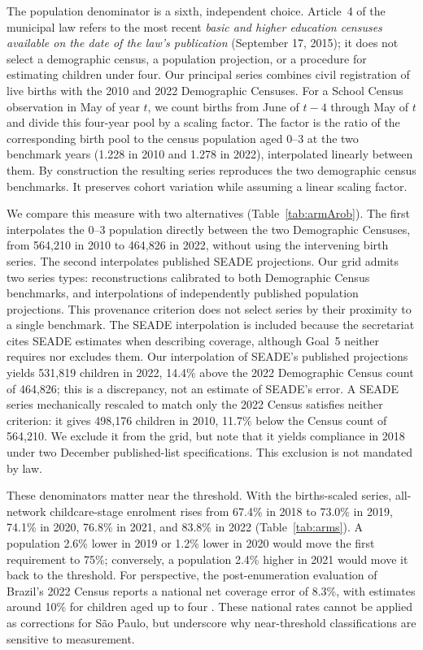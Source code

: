 The population denominator is a sixth, independent choice. Article~4 of the municipal law refers to the most recent \emph{basic and higher education censuses available on the date of the law's publication} (September 17, 2015); it does not select a demographic census, a population projection, or a procedure for estimating children under four. Our principal series combines civil registration of live births with the 2010 and 2022 Demographic Censuses. For a School Census observation in May of year $t$, we count births from June of $t-4$ through May of $t$ and divide this four-year pool by a scaling factor. The factor is the ratio of the corresponding birth pool to the census population aged 0--3 at the two benchmark years (1.228 in 2010 and 1.278 in 2022), interpolated linearly between them. By construction the resulting series reproduces the two demographic census benchmarks. It preserves cohort variation while assuming a linear scaling factor.

We compare this measure with two alternatives (Table~\ref{tab:armArob}). The first interpolates the 0--3 population directly between the two Demographic Censuses, from 564,210 in 2010 to 464,826 in 2022, without using the intervening birth series. The second interpolates published SEADE projections. Our grid admits two series types: reconstructions calibrated to both Demographic Census benchmarks, and interpolations of independently published population projections. This provenance criterion does not select series by their proximity to a single benchmark. The SEADE interpolation is included because the secretariat cites SEADE estimates when describing coverage, although Goal~5 neither requires nor excludes them. Our interpolation of SEADE's published projections yields 531,819 children in 2022, 14.4\% above the 2022 Demographic Census count of 464,826; this is a discrepancy, not an estimate of SEADE's error. A SEADE series mechanically rescaled to match only the 2022 Census satisfies neither criterion: it gives 498,176 children in 2010, 11.7\% below the Census count of 564,210. We exclude it from the grid, but note that it yields compliance in 2018 under two December published-list specifications. This exclusion is not mandated by law.

These denominators matter near the threshold. With the births-scaled series, all-network childcare-stage enrolment rises from 67.4\% in 2018 to 73.0\% in 2019, 74.1\% in 2020, 76.8\% in 2021, and 83.8\% in 2022 (Table~\ref{tab:arms}). A population 2.6\% lower in 2019 or 1.2\% lower in 2020 would move the first requirement to 75\%; conversely, a population 2.4\% higher in 2021 would move it back to the threshold. For perspective, the post-enumeration evaluation of Brazil's 2022 Census reports a national net coverage error of 8.3\%, with estimates around 10\% for children aged up to four \citep{agenciabrasil2024ppe}. These national rates cannot be applied as corrections for S\~ao Paulo, but underscore why near-threshold classifications are sensitive to measurement.

